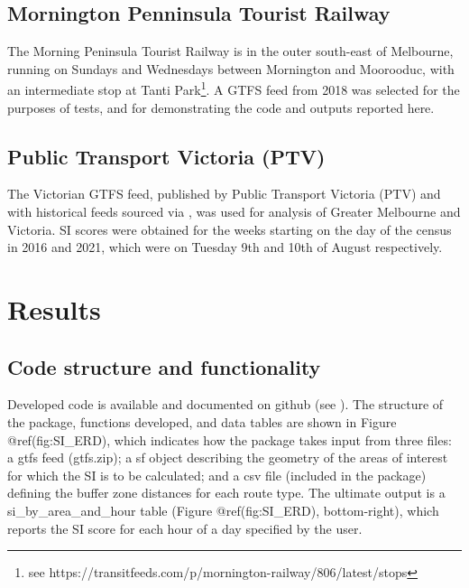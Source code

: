 \documentclass[preprint, 3p,
authoryear]{elsarticle} %
\begin{document}
\hypertarget{mornington-penninsula-tourist-railway}{%
\subsection{Mornington Penninsula Tourist
Railway}\label{mornington-penninsula-tourist-railway}}

The Morning Peninsula Tourist Railway is in the outer south-east of
Melbourne, running on Sundays and Wednesdays between Mornington and
Moorooduc, with an intermediate stop at Tanti Park\footnote{see
  https://transitfeeds.com/p/mornington-railway/806/latest/stops}. A
GTFS feed from 2018 was selected for the purposes of tests, and for
demonstrating the code and outputs reported here.

\hypertarget{public-transport-victoria-ptv}{%
\subsection{Public Transport Victoria
(PTV)}\label{public-transport-victoria-ptv}}

The Victorian GTFS feed, published by Public Transport Victoria (PTV)
and with historical feeds sourced via
\citet{transitfeeds_victoria:2023aa}, was used for analysis of Greater
Melbourne and Victoria. SI scores were obtained for the weeks starting
on the day of the census in 2016 and 2021, which were on Tuesday 9th and
10th of August respectively.

\hypertarget{results}{%
\section{Results}\label{results}}

\hypertarget{code-structure-and-functionality}{%
\subsection{Code structure and
functionality}\label{code-structure-and-functionality}}

Developed code is available and documented on github (see
\citet{gtfssupplyindex_github}). The structure of the package, functions
developed, and data tables are shown in Figure @ref(fig:SI\_ERD), which
indicates how the package takes input from three files: a gtfs feed
(gtfs.zip); a sf object describing the geometry of the areas of interest
for which the SI is to be calculated; and a csv file (included in the
package) defining the buffer zone distances for each route type. The
ultimate output is a si\_by\_area\_and\_hour table (Figure
@ref(fig:SI\_ERD), bottom-right), which reports the SI score for each
hour of a day specified by the user.
\end{document}
